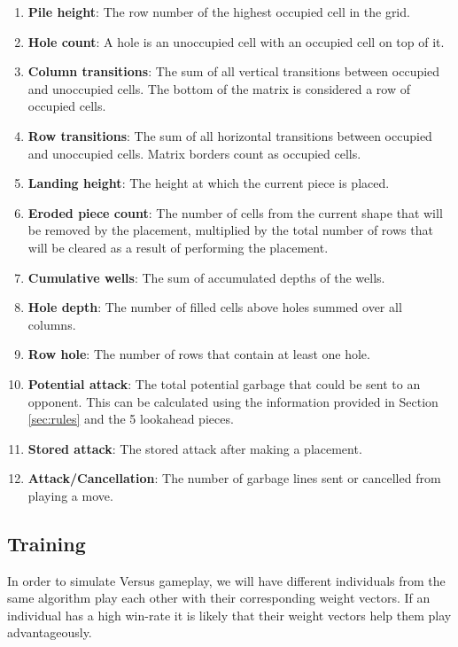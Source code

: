 \documentclass[a4paper, 12pt]{extreport}
\begin{document}
				\begin{enumerate}
					\item \textbf{Pile height}: The row number of the highest occupied cell in the grid.
					\item \textbf{Hole count}: A hole is an unoccupied cell with an occupied cell on top of it.
					\item \textbf{Column transitions}: The sum of all vertical transitions between occupied and unoccupied cells. The bottom of the matrix is considered a row of occupied cells.
					\item \textbf{Row transitions}: The sum of all horizontal transitions between occupied and unoccupied cells. Matrix borders count as occupied cells.
					\item \textbf{Landing height}: The height at which the current piece is placed.
					\item \textbf{Eroded piece count}: The number of cells from the current shape that will be removed by the placement, multiplied by the total number of rows that will be cleared as a result of performing the placement.
					\item \textbf{Cumulative wells}: The sum of accumulated depths of the wells.
					\item \textbf{Hole depth}: The number of filled cells above holes summed over all columns.
					\item \textbf{Row hole}: The number of rows that contain at least one hole.
					\item \textbf{Potential attack}: The total potential garbage that could be sent to an opponent. This can be calculated using the information provided in Section \ref{sec:rules} and the 5 lookahead pieces.
					\item \textbf{Stored attack}: The stored attack after making a placement.
					\item \textbf{Attack/Cancellation}: The number of garbage lines sent or cancelled from playing a move.
				\end{enumerate}
				
			\subsection{Training}
			
				In order to simulate Versus gameplay, we will have different individuals from the same algorithm play each other with their corresponding weight vectors. If an individual has a high win-rate it is likely that their weight vectors help them play advantageously.
				
\end{document}
